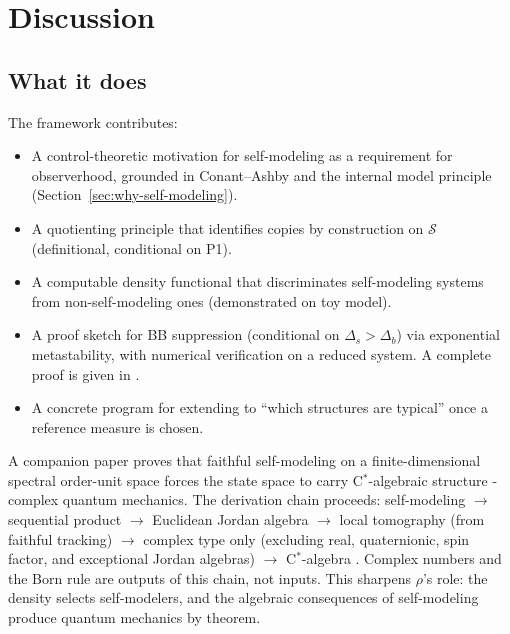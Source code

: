 \documentclass[12pt]{article}
\theoremstyle{remark}
\begin{document}

\section{Discussion}\label{sec:discussion}

\subsection{What it does}

The framework contributes:
\begin{itemize}[leftmargin=2em]
\item A control-theoretic motivation for self-modeling as a requirement for observerhood, grounded in Conant--Ashby and the internal model principle (Section~\ref{sec:why-self-modeling}).
\item A quotienting principle that identifies copies by construction on $\mathcal{S}$ (definitional, conditional on P1).
\item A computable density functional that discriminates self-modeling systems from non-self-modeling ones (demonstrated on toy model).
\item A proof sketch for BB suppression (conditional on $\Delta_s > \Delta_b$) via exponential metastability, with numerical verification on a reduced system. A complete proof is given in \cite{ehrlich2026thma}.
\item A concrete program for extending to ``which structures are typical'' once a reference measure is chosen.
\end{itemize}
A companion paper \cite{ehrlich2026qm} proves that faithful self-modeling on a finite-dimensional spectral order-unit space forces the state space to carry C$^*$-algebraic structure - complex quantum mechanics. The derivation chain proceeds: self-modeling $\to$ sequential product $\to$ Euclidean Jordan algebra \cite{vdw2019a} $\to$ local tomography (from faithful tracking) $\to$ complex type only (excluding real, quaternionic, spin factor, and exceptional Jordan algebras) $\to$ C$^*$-algebra \cite{vdw2019b,barnum-wilce2016,hanche-olsen1984}. Complex numbers and the Born rule are outputs of this chain, not inputs. This sharpens $\rho$'s role: the density selects self-modelers, and the algebraic consequences of self-modeling produce quantum mechanics by theorem.
\end{document}
